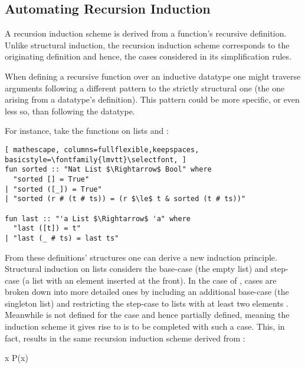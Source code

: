 \subsection{Automating Recursion Induction}
\label{sec:rec-ind}
A recursion induction scheme is derived from a function's recursive definition.
Unlike structural induction, the recursion induction scheme corresponds to the originating definition and hence, the cases considered in its simplification rules.

When defining a recursive function over an inductive datatype one might traverse arguments following a different pattern to the strictly structural one (the one arising from a datatype's definition). This pattern could be more specific, or even less so, than following the datatype.

For instance, take the functions on lists  and :

\begin{lstlisting}[ mathescape, columns=fullflexible,keepspaces, basicstyle=\fontfamily{lmvtt}\selectfont, ]
fun sorted :: "Nat List $\Rightarrow$ Bool" where
  "sorted [] = True"
| "sorted ([_]) = True"
| "sorted (r # (t # ts)) = (r $\le$ t & sorted (t # ts))"

fun last :: "'a List $\Rightarrow$ 'a" where
  "last ([t]) = t"
| "last (_ # ts) = last ts"
\end{lstlisting}

\noindent From these definitions' structures one can derive a new induction principle.
Structural induction on lists considers the base-case \isaCode{[]} (the empty list) and step-case  (a list with an element inserted at the front).
In the case of , cases are broken down into more detailed ones by including an additional base-case \isaCode{[t]} (the singleton list) and restricting the step-case to lists with at least two elements .
Meanwhile  is not defined for the case \isaCode{[]} and hence partially defined, meaning the induction scheme it gives rise to is to be completed with such a case.
This, in fact, results in the same recursion induction scheme derived from :

\vspace{2 mm}

  {\forall x \;\; P\;(x)}

